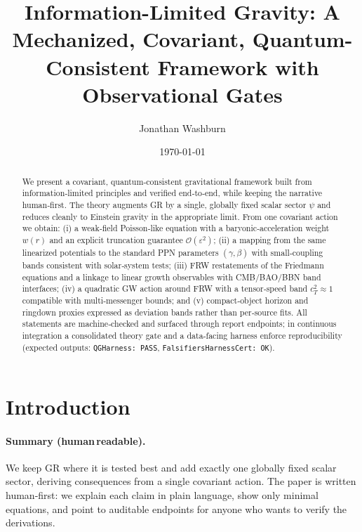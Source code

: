 \documentclass[aps,prd,twocolumn,superscriptaddress,nofootinbib,floatfix,longbibliography]{revtex4-2}
\newcommand{\Order}{\mathcal{O}}
\begin{document}
\title{Information-Limited Gravity: A Mechanized, Covariant, Quantum-Consistent Framework with Observational Gates}

\author{Jonathan Washburn}


\date{\today}

\begin{abstract}
We present a covariant, quantum‑consistent gravitational framework built from information‑limited principles and verified end‑to‑end, while keeping the narrative human‑first. The theory augments GR by a single, globally fixed scalar sector $\psi$ and reduces cleanly to Einstein gravity in the appropriate limit. From one covariant action we obtain: (i) a weak‑field Poisson‑like equation with a baryonic‑acceleration weight $w(r)$ and an explicit truncation guarantee $\Order(\varepsilon^{2})$; (ii) a mapping from the same linearized potentials to the standard PPN parameters $(\gamma,\beta)$ with small‑coupling bands consistent with solar‑system tests; (iii) FRW restatements of the Friedmann equations and a linkage to linear growth observables with CMB/BAO/BBN band interfaces; (iv) a quadratic GW action around FRW with a tensor‑speed band $c_T^2\approx 1$ compatible with multi‑messenger bounds; and (v) compact‑object horizon and ringdown proxies expressed as deviation bands rather than per‑source fits. All statements are machine‑checked and surfaced through report endpoints; in continuous integration a consolidated theory gate and a data‑facing harness enforce reproducibility (expected outputs: \texttt{QGHarness: PASS}, \texttt{FalsifiersHarnessCert: OK}).
\end{abstract}

\maketitle


\section{Introduction}\label{sec:intro}
%
\paragraph*{Summary (human\,readable).}
We keep GR where it is tested best and add exactly one globally fixed scalar sector, deriving consequences from a single covariant action. The paper is written human‑first: we explain each claim in plain language, show only minimal equations, and point to auditable endpoints for anyone who wants to verify the derivations.
\end{document}

